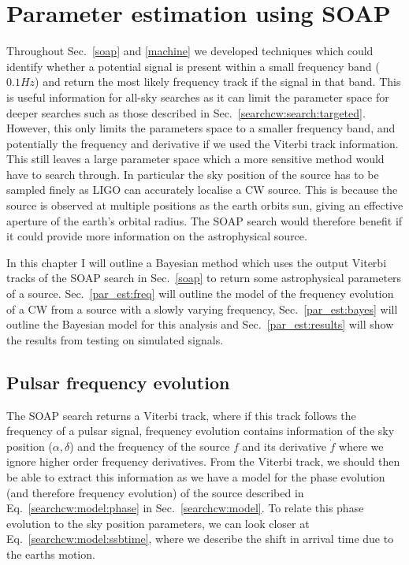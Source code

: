 \chapter{\label{par_est}Parameter estimation using SOAP}

Throughout Sec.~\ref{soap} and \ref{machine} we developed techniques which could identify whether a potential signal is present within a small frequency band ($0.1 Hz$) and return the most likely frequency track if the signal in that band.
This is useful information for all-sky searches as it can limit the parameter space for deeper searches such as those described in Sec.~\ref{searchcw:search:targeted}. 
However, this only limits the parameters space to a smaller frequency band, and potentially the frequency and derivative if we used the Viterbi track information.
This still leaves a large parameter space which a more sensitive method would have to search through.
In particular the sky position of the source has to be sampled finely as \gls{LIGO} can accurately localise a \gls{CW} source.
This is because the source is observed at multiple positions as the earth orbits sun, giving an effective aperture of the earth's orbital radius.
The SOAP search would therefore benefit if it could provide more information on the astrophysical source.

In this chapter I will outline a Bayesian method which uses the output Viterbi tracks of the SOAP search in Sec.~\ref{soap} to return some astrophysical parameters of a source.
Sec.~\ref{par_est:freq} will outline the model of the frequency evolution of a \gls{CW} from a source with a slowly varying frequency,
Sec.~\ref{par_est:bayes} will outline the Bayesian model for this analysis and Sec.~\ref{par_est:results} will show the results from testing on simulated signals.

\section{\label{par_est:freq}Pulsar frequency evolution}

The SOAP search returns a Viterbi track, where if this track follows the frequency of a pulsar signal, frequency evolution contains information of the sky position ($\alpha, \delta$) and the frequency of the source $f$ and its derivative $\dot{f}$ where we ignore higher order frequency derivatives.
From the Viterbi track, we should then be able to extract this information as we have a model for the phase evolution (and therefore frequency evolution) of the source described in Eq.~\ref{searchcw:model:phase} in Sec.~\ref{searchcw:model}.
To relate this phase evolution to the sky position parameters, we can look closer at Eq.~\ref{searchcw:model:ssbtime}, where we describe the shift in arrival time due to the earths motion. 

